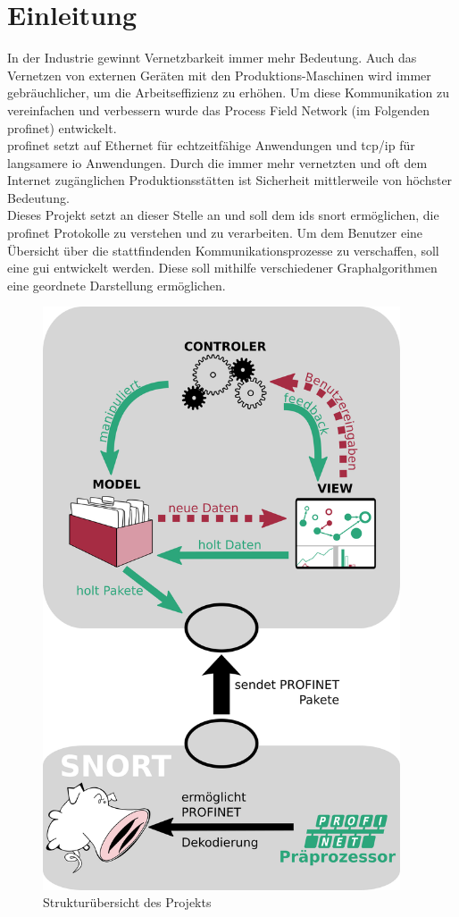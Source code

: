 \chapter*{Einleitung}

In der Industrie gewinnt Vernetzbarkeit immer mehr Bedeutung. Auch das Vernetzen von externen Geräten mit den Produktions-Maschinen wird immer gebräuchlicher, um die Arbeitseffizienz zu erhöhen. Um diese Kommunikation zu vereinfachen und verbessern wurde das Process Field Network (im Folgenden \gls{profinet}) entwickelt.\\
\gls{profinet} setzt auf Ethernet für echtzeitfähige Anwendungen und \gls{tcp}/\gls{ip} für langsamere \gls{io} Anwendungen. Durch die immer mehr vernetzten und oft dem Internet zugänglichen Produktionsstätten ist Sicherheit mittlerweile von höchster Bedeutung. \\
Dieses Projekt setzt an dieser Stelle an und soll dem \gls{ids} \gls{snort} ermöglichen, die \gls{profinet} Protokolle zu verstehen und zu verarbeiten. Um dem Benutzer eine Übersicht über die stattfindenden Kommunikationsprozesse zu verschaffen, soll eine \gls{gui} entwickelt werden. Diese soll mithilfe verschiedener Graphalgorithmen eine geordnete Darstellung ermöglichen.\\

\begin{figure}[H]
  \centering
  \includegraphics[width=300pt]{../diagrams/intro_diagram/intro_diagram.png}
  \caption[Strukturübersicht des Projekts]{Strukturübersicht des Projekts}\label{fig:diagram}
\end{figure}

